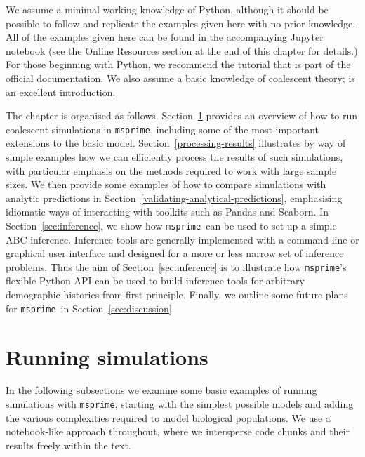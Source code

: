 \documentclass[graybox]{svmult}
\newcommand{\msprime}[0]{\texttt{msprime}}
\begin{document}
We assume a minimal working knowledge of Python, although it should be
possible to follow and replicate the examples given here with no prior
knowledge. All of the examples
given here can be found in the accompanying Jupyter notebook (see
the Online Resources section at the end of this chapter for details.)
For those beginning with Python, we recommend the
tutorial that is part of the official documentation.
We also assume a basic knowledge of coalescent theory;
\cite{wakely2008coalescent} is an excellent introduction.

The chapter is organised as follows.
Section~\ref{running-simulations} provides an overview of how to run coalescent simulations in \msprime, including some of the most important extensions to the basic model.
Section~\ref{processing-results} illustrates by way of simple examples how we can efficiently process the results
of such simulations, with particular emphasis on the methods
required to work with large sample sizes. We then provide
some examples of how to compare simulations with analytic
predictions in Section~\ref{validating-analytical-predictions},
emphasising idiomatic ways of interacting with toolkits such as
Pandas and Seaborn. In Section~\ref{sec:inference}, we show
how \msprime\ can be used to set up a simple ABC inference.
Inference tools are generally implemented with a command line or graphical
user interface and designed for a more or less narrow set of inference
problems. Thus the aim of Section~\ref{sec:inference} is to illustrate how
\msprime's flexible Python API can be used to build inference tools for arbitrary demographic histories from first principle.
Finally, we outline some future plans for \msprime\ in Section~\ref{sec:discussion}.

\section{Running simulations}
\label{running-simulations}
In the following subsections we examine some basic examples of running
simulations with \msprime, starting with the simplest possible models
and adding the various complexities required to model biological populations.
We use a notebook-like approach throughout, where we
intersperse code chunks and their results freely within the text.
\end{document}

